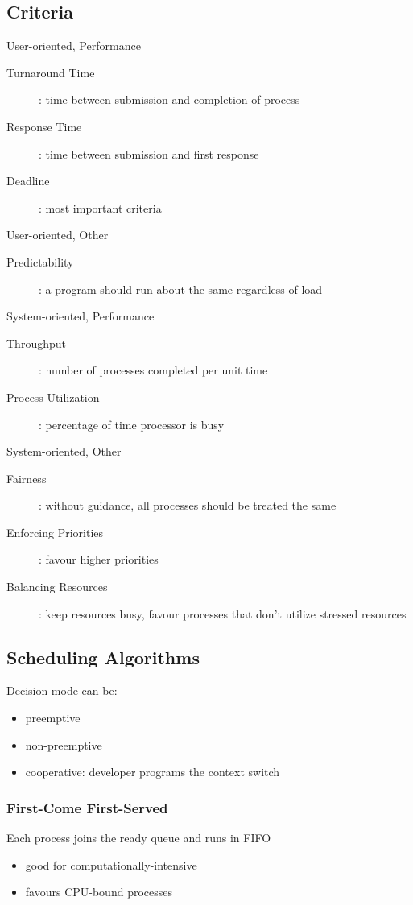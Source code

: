 \documentclass[]{article}
\theoremstyle{definition}
\begin{document}
	\subsection{Criteria}
	User-oriented, Performance
	\begin{description}
		\item[Turnaround Time]: time between submission and completion of process
		\item[Response Time]: time between submission and first response
		\item[Deadline]: most important criteria
	\end{description}
	User-oriented, Other
	\begin{description}
		\item[Predictability]: a program should run about the same regardless of load
	\end{description}
	System-oriented, Performance
	\begin{description}
		\item[Throughput]: number of processes completed per unit time
		\item[Process Utilization]: percentage of time processor is busy
	\end{description}
	System-oriented, Other
	\begin{description}
		\item[Fairness]: without guidance, all processes should be treated the same
		\item[Enforcing Priorities]: favour higher priorities
		\item[Balancing Resources]: keep resources busy, favour processes that don't utilize stressed resources
	\end{description}

	\subsection{Scheduling Algorithms}
	Decision mode can be:
	\begin{itemize}
		\item preemptive
		\item non-preemptive
		\item cooperative: developer programs the context switch
	\end{itemize}

	\subsubsection{First-Come First-Served}
	Each process joins the ready queue and runs in FIFO
	\begin{itemize}
		\item good for computationally-intensive
		\item favours CPU-bound processes
	\end{itemize}
\end{document}
